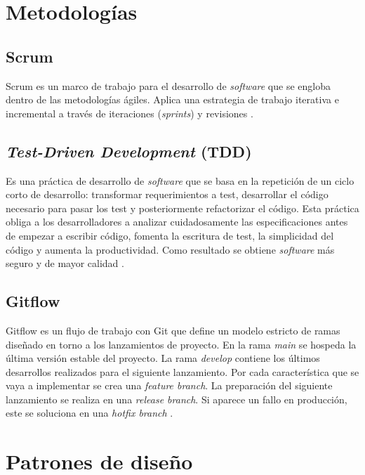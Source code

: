 
\section{Metodologías}\label{metodologias}

\subsection{Scrum}\label{scrum}

Scrum es un marco de trabajo para el desarrollo de \emph{software} que se
engloba dentro de las metodologías ágiles. Aplica una estrategia de
trabajo iterativa e incremental a través de iteraciones (\emph{sprints})
y revisiones \citep{wiki:scrum}.

\subsection{\emph{Test-Driven Development} (TDD)}\label{test-driven-development-tdd}

Es una práctica de desarrollo de \emph{software} que se basa en la repetición
de un ciclo corto de desarrollo: transformar requerimientos a test,
desarrollar el código necesario para pasar los test y posteriormente
refactorizar el código. Esta práctica obliga a los desarrolladores a
analizar cuidadosamente las especificaciones antes de empezar a escribir
código, fomenta la escritura de test, la simplicidad del código y
aumenta la productividad. Como resultado se obtiene \emph{software} más seguro
y de mayor calidad \citep{wiki:tdd}.

\subsection{Gitflow}\label{gitflow}

Gitflow es un flujo de trabajo con Git que define un modelo estricto de ramas
diseñado en torno a los lanzamientos de proyecto. En la rama \emph{main}
se hospeda la última versión estable del proyecto. La rama
\emph{develop} contiene los últimos desarrollos realizados para el
siguiente lanzamiento. Por cada característica que se vaya a implementar
se crea una \emph{feature branch}. La preparación del siguiente
lanzamiento se realiza en una \emph{release branch}. Si aparece un fallo
en producción, este se soluciona en una \emph{hotfix branch} \citep{git:gitflow}.

\section{Patrones de diseño}\label{patrones-de-diseno}

